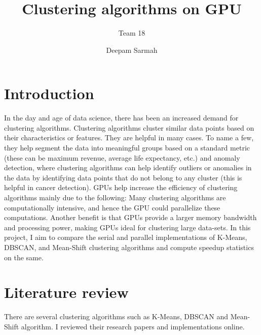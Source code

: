 \documentclass[acmlarge,noacm]{acmart}
\begin{document}
\title{Clustering algorithms on GPU}
\subtitle{Team 18}
\author{Deepam Sarmah}

\renewcommand{\shortauthors}{Deepam Sarmah}

\maketitle

\section{Introduction}
In the day and age of data science, there has been an increased demand for clustering algorithms. Clustering algorithms cluster similar data points based on their characteristics or features. They are helpful in many cases. To name a few, they help segment the data into meaningful groups based on a standard metric (these can be maximum revenue,  average life expectancy, etc.) and anomaly detection, where clustering algorithms can help identify outliers or anomalies in the data by identifying data points that do not belong to any cluster (this is helpful in cancer detection). GPUs help increase the efficiency of clustering algorithms mainly due to the following: Many clustering algorithms are computationally intensive, and hence the GPU could parallelize these computations. Another benefit is that GPUs provide a larger memory bandwidth and processing power, making GPUs ideal for clustering large data-sets. In this project, I aim to compare the serial and parallel implementations of K-Means, DBSCAN, and Mean-Shift clustering algorithms and compute speedup statistics on the same.


\section{Literature review}
There are several clustering algorithms such as K-Means, DBSCAN and Mean-Shift algorithm. I reviewed their research papers and implementations online.
\end{document}
